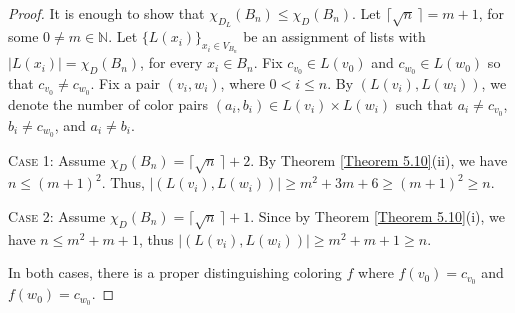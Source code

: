 \documentclass[12pt,reqno,a4paper]{amsart}
\theoremstyle{definition}
\begin{document}
\begin{proof}
   It is enough to show that $\chi_{D_L}(B_n) \leq \chi_D(B_n)$. Let $\lceil \sqrt{n}\,\rceil = m+1$, for some $0\neq m\in \mathbb{N}$. Let $\{L(x_i)\}_{x_i\in V_{B_n}}$ be an assignment of lists with $|L(x_i)| = \chi_{D}(B_n)$, for every $x_i\in B_n$. Fix $c_{v_0}\in L(v_0)$ and $c_{w_0}\in L(w_0)$ so that $c_{v_0}\neq c_{w_0}$. Fix a pair $(v_i,w_i)$, where $0<i\leq n$. By $(L(v_i), L(w_i))$, we denote the number of color pairs $(a_i,b_i)\in L(v_i)\times L(w_i)$ such that $a_i\neq c_{v_0}$, $b_i\neq c_{w_0}$, and $a_{i}\neq b_{i}$.
    
\noindent \textsc{Case 1:} Assume $\chi_D(B_n) =\lceil \sqrt{n}\,\rceil+2$. By Theorem \ref{Theorem 5.10}(ii), we have $n\leq (m+1)^2$. Thus, $|(L(v_i), L(w_i))|\geq  m^2 + 3m + 6 \geq (m+1)^2 \geq n$. 

\noindent \textsc{Case 2:} Assume $\chi_D(B_n) =\lceil \sqrt{n}\,\rceil+1$. Since by Theorem \ref{Theorem 5.10}(i), we have $n \leq m^2 + m + 1$, thus $|(L(v_i), L(w_i))|\geq m^2 + m + 1\geq n$.

\noindent In both cases, there is a proper distinguishing coloring $f$ where $f(v_0) = c_{v_0}$ and $f(w_0)=c_{w_0}$.
\end{proof}
\end{document}
